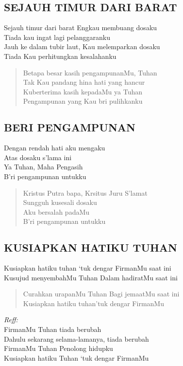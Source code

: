 \subsection{SEJAUH TIMUR DARI BARAT} 
\begin{altverse}
Sejauh timur dari barat Engkau membuang dosaku\\ 
Tiada kau ingat lagi pelanggaranku\\ 
Jauh ke dalam tubir laut, Kau melemparkan dosaku\\ 
Tiada Kau perhitungkan kesalahanku 
\end{altverse}
\begin{verse}
Betapa besar kasih pengampunanMu, Tuhan\\ 
Tak Kau pandang hina hati yang hancur\\ 
Kuberterima kasih kepadaMu ya Tuhan \\
Pengampunan yang Kau bri pulihkanku 
\end{verse}

\subsection{BERI PENGAMPUNAN} 
\begin{altverse}
Dengan rendah hati aku mengaku \\
Atas dosaku s’lama ini \\
Ya Tuhan, Maha Pengasih \\
B’ri pengampunan untukku 
\end{altverse}
\begin{verse}
Kristus Putra bapa, Krsitus Juru S’lamat \\
Sungguh kusesali dosaku \\
Aku bersalah padaMu \\
B’ri pengampunan untukku 
\end{verse}

\subsection{KUSIAPKAN HATIKU TUHAN} 
\begin{altverse}
Kusiapkan hatiku tuhan ‘tuk dengar FirmanMu saat ini \\
Kusujud menyembahMu Tuhan Dalam hadiratMu saat ini 
\end{altverse}
\begin{verse}
Curahkan urapanMu Tuhan Bagi jemaatMu saat ini \\
Kusiapkan hatiku tuhan’tuk dengar FirmanMu 
\end{verse}
\begin{altverse}
\textit{Reff:} \\
FirmanMu Tuhan tiada berubah \\
Dahulu sekarang selama-lamanya, tiada berubah \\
FirmanMu Tuhan Penolong hidupku \\
Kusiapkan hatiku Tuhan ‘tuk dengar FirmanMu 
\end{altverse}

